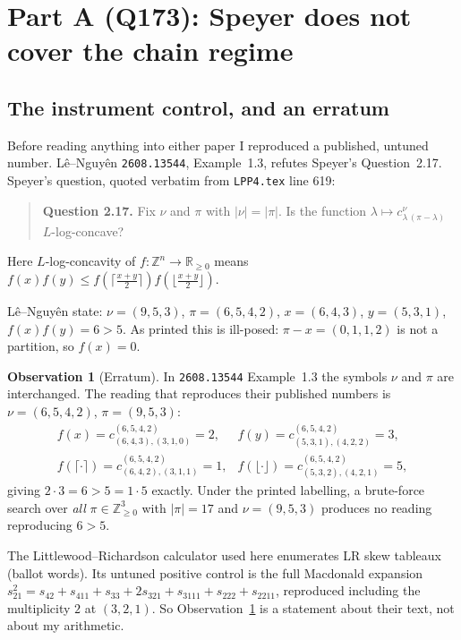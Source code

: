 \documentclass[11pt]{article}
\theoremstyle{definition}
\newtheorem{observation}[theorem]{Observation}
\newcommand{\Z}{\mathbb{Z}}
\begin{document}
\section{Part A (Q173): Speyer does not cover the chain regime}

\subsection{The instrument control, and an erratum}

Before reading anything into either paper I reproduced a published, untuned number.
L\^e--Nguy\^en \texttt{2608.13544}, Example~1.3, refutes Speyer's Question~2.17. Speyer's
question, quoted verbatim from \texttt{LPP4.tex} line 619:

\begin{quote}
\textbf{Question 2.17.} Fix $\nu$ and $\pi$ with $|\nu|=|\pi|$. Is the function
$\lambda \mapsto c^{\nu}_{\lambda\,(\pi-\lambda)}$ $L$-log-concave?
\end{quote}

Here $L$-log-concavity of $f:\Z^n\to\mathbb{R}_{\ge0}$ means
$f(x)f(y)\le f\!\left(\lceil\tfrac{x+y}{2}\rceil\right) f\!\left(\lfloor\tfrac{x+y}{2}\rfloor\right)$.

L\^e--Nguy\^en state: $\nu=(9,5,3)$, $\pi=(6,5,4,2)$, $x=(6,4,3)$, $y=(5,3,1)$,
$f(x)f(y)=6>5$. As printed this is ill-posed: $\pi-x=(0,1,1,2)$ is not a partition, so
$f(x)=0$.

\begin{observation}[Erratum]\label{obs:erratum}
In \texttt{2608.13544} Example~1.3 the symbols $\nu$ and $\pi$ are interchanged. The
reading that reproduces their published numbers is $\nu=(6,5,4,2)$, $\pi=(9,5,3)$:
\[
\begin{array}{llll}
f(x)=c^{(6,5,4,2)}_{(6,4,3),(3,1,0)}=2, &
f(y)=c^{(6,5,4,2)}_{(5,3,1),(4,2,2)}=3, \\[2pt]
f(\lceil\cdot\rceil)=c^{(6,5,4,2)}_{(6,4,2),(3,1,1)}=1, &
f(\lfloor\cdot\rfloor)=c^{(6,5,4,2)}_{(5,3,2),(4,2,1)}=5,
\end{array}
\]
giving $2\cdot3=6>5=1\cdot5$ exactly. Under the printed labelling, a brute-force search
over \emph{all} $\pi\in\Z^3_{\ge0}$ with $|\pi|=17$ and $\nu=(9,5,3)$ produces no reading
reproducing $6>5$.
\end{observation}

The Littlewood--Richardson calculator used here enumerates LR skew tableaux (ballot
words). Its untuned positive control is the full Macdonald expansion
$s_{21}^2=s_{42}+s_{411}+s_{33}+2s_{321}+s_{3111}+s_{222}+s_{2211}$, reproduced including
the multiplicity $2$ at $(3,2,1)$. So Observation~\ref{obs:erratum} is a statement about
their text, not about my arithmetic.
\end{document}

